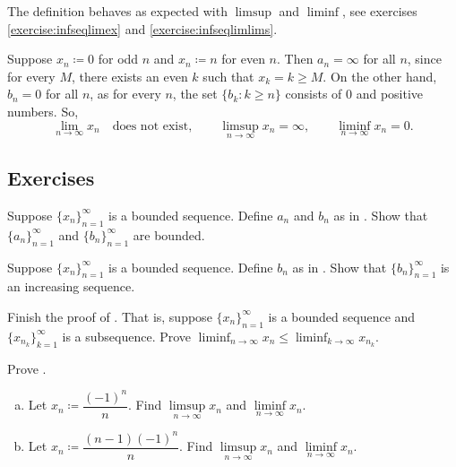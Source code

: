 The definition behaves as expected with
$\limsup$ and $\liminf$, see exercises \ref{exercise:infseqlimex}
and \ref{exercise:infseqlimlims}.

\begin{example}
Suppose
$x_n \coloneqq 0$ for odd $n$ and $x_n \coloneqq n$ for even $n$.
Then $a_n = \infty$ for all $n$, since for every $M$,
there exists an even $k$ such that $x_k = k \geq M$.
On the other hand, $b_n = 0$ for all $n$, as
for every $n$, the set
$\{ b_k : k \geq n \}$ consists of $0$ and positive numbers.
So,
\begin{equation*}
\lim_{n\to \infty} x_n \quad \text{does not exist},
\qquad
\limsup_{n\to \infty} x_n = \infty ,
\qquad
\liminf_{n\to \infty} x_n = 0.
\end{equation*}
\end{example}

\subsection{Exercises}

\begin{exercise}
Suppose $\{ x_n \}_{n=1}^\infty$ is a bounded sequence.  Define $a_n$ and
$b_n$ as in .  Show that $\{ a_n \}_{n=1}^\infty$
and $\{ b_n \}_{n=1}^\infty$ are bounded.
\end{exercise}

\begin{exercise}
Suppose $\{ x_n \}_{n=1}^\infty$ is a bounded sequence.
Define $b_n$ as in .  Show that
$\{ b_n \}_{n=1}^\infty$ is an increasing sequence.
\end{exercise}

\begin{exercise}
Finish the proof of .  That is,
suppose $\{ x_n \}_{n=1}^\infty$ is a bounded sequence and
$\{ x_{n_k} \}_{k=1}^\infty$ is a subsequence.  Prove
$\displaystyle \liminf_{n\to\infty} x_n \leq
\liminf_{k\to\infty} x_{n_k}$.
\end{exercise}

\begin{exercise}
Prove .
\end{exercise}

\begin{exercise}
\leavevmode
\begin{enumerate}[a)]
\item
Let $x_n \coloneqq \dfrac{{(-1)}^n}{n}$.
Find $\limsup\limits_{n\to\infty} x_n$ and $\liminf\limits_{n\to\infty} x_n$.
\item
Let $x_n \coloneqq \dfrac{(n-1){(-1)}^n}{n}$.
Find $\limsup\limits_{n\to\infty} x_n$ and $\liminf\limits_{n\to\infty} x_n$.
\end{enumerate}
\end{exercise}

